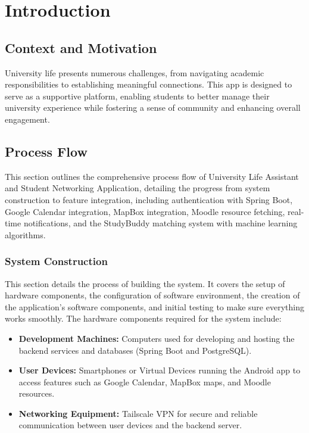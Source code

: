 \documentclass{article}
\makeatletter
\newcommand\subsubsubsection{\@startsection{paragraph}{4}{\z@}{-2.5ex\@plus -1ex \@minus -.25ex}{1.25ex \@plus .25ex}{\normalfont\normalsize\bfseries}}
\makeatother
\begin{document}


\tableofcontents
\newpage

\listfigurename
\newpage

\listtablename
\newpage



\section{Introduction}

\subsection{Context and Motivation}
\noindent University life presents numerous challenges, 
from navigating academic responsibilities to establishing meaningful connections. 
This app is designed to serve as a supportive platform, 
enabling students to better manage their university experience while 
fostering a sense of community and enhancing overall engagement.
\subsection{Process Flow}
This section outlines the comprehensive process flow of University Life Assistant and Student Networking Application,
detailing the progress from system construction to feature integration,
including authentication with Spring Boot, Google Calendar integration, MapBox integration, Moodle resource fetching, real-time notifications, and the StudyBuddy matching system with machine learning algorithms.
\subsubsection{System Construction}
This section details the process of building the system.
It covers the setup of hardware components, the configuration of software environment,
the creation of the application's software components, and initial testing to make sure everything works smoothly.
\subsubsubsection{Hardware Setup}
The hardware components required for the system include:
\begin{itemize}
    \item \textbf{Development Machines: }Computers used for developing and hosting the backend services and databases (Spring Boot and PostgreSQL).
    \item \textbf{User Devices: }Smartphones or Virtual Devices running the Android app to access features such as Google Calendar, MapBox maps, and Moodle resources.
    \item \textbf{Networking Equipment: }Tailscale VPN for secure and reliable communication between user devices and the backend server.
\end{itemize}
\end{document}
